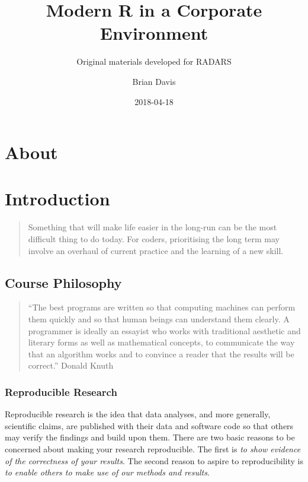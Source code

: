 \documentclass[]{book}
\title{Modern R in a Corporate Environment}
\subtitle{Original materials developed for RADARS}
\author{Brian Davis}
\date{2018-04-18}
\theoremstyle{definition}
\theoremstyle{definition}
\theoremstyle{definition}
\theoremstyle{remark}
\begin{document}
\maketitle

{
\setcounter{tocdepth}{1}
\tableofcontents
}
\chapter*{About}\label{about}

\chapter{Introduction}\label{intro}

\begin{quote}
Something that will make life easier in the long-run can be the most
difficult thing to do today. For coders, prioritising the long term may
involve an overhaul of current practice and the learning of a new skill.
\end{quote}

\section{Course Philosophy}\label{course-philosophy}

\begin{quote}
``The best programs are written so that computing machines can perform
them quickly and so that human beings can understand them clearly. A
programmer is ideally an essayist who works with traditional aesthetic
and literary forms as well as mathematical concepts, to communicate the
way that an algorithm works and to convince a reader that the results
will be correct.'' Donald Knuth
\end{quote}

\subsection{Reproducible Research}\label{reproducible-research}

Reproducible research is the idea that data analyses, and more
generally, scientific claims, are published with their data and software
code so that others may verify the findings and build upon them. There
are two basic reasons to be concerned about making your research
reproducible. The first is \emph{to show evidence of the correctness of
your results}. The second reason to aspire to reproducibility is
\emph{to enable others to make use of our methods and results}.
\end{document}
